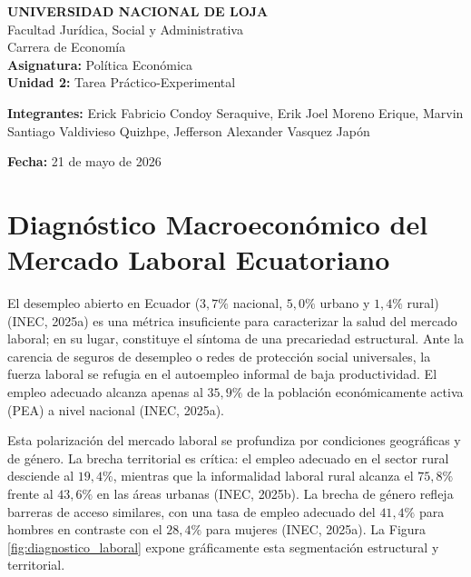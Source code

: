 \documentclass[10pt,]{article}
\renewcommand*\figurename{Figure}
\newcommand\figurename{Figure}
\renewcommand*\tablename{Table}
\newcommand\tablename{Table}
\begin{document}
\renewcommand{\figurename}{Figura}
\renewcommand{\tablename}{Tabla}

\begin{center}
\textbf{UNIVERSIDAD NACIONAL DE LOJA} \\
Facultad Jurídica, Social y Administrativa \\
Carrera de Economía \\
\textbf{Asignatura:} Política Económica \\
\textbf{Unidad 2:} Tarea Práctico-Experimental \\
\vspace{1em}
\end{center}

\noindent \textbf{Integrantes:} Erick Fabricio Condoy Seraquive, Erik
Joel Moreno Erique, Marvin Santiago Valdivieso Quizhpe, Jefferson
Alexander Vasquez Japón

\noindent \textbf{Fecha:} 21 de mayo de 2026 \vspace{1.5em}

\section{Diagnóstico Macroeconómico del Mercado Laboral
Ecuatoriano}\label{diagnuxf3stico-macroeconuxf3mico-del-mercado-laboral-ecuatoriano}

El desempleo abierto en Ecuador (\(3,7\%\) nacional, \(5,0\%\) urbano y
\(1,4\%\) rural) (INEC, 2025a) es una métrica insuficiente para
caracterizar la salud del mercado laboral; en su lugar, constituye el
síntoma de una precariedad estructural. Ante la carencia de seguros de
desempleo o redes de protección social universales, la fuerza laboral se
refugia en el autoempleo informal de baja productividad. El empleo
adecuado alcanza apenas al \(35,9\%\) de la población económicamente
activa (PEA) a nivel nacional (INEC, 2025a).

Esta polarización del mercado laboral se profundiza por condiciones
geográficas y de género. La brecha territorial es crítica: el empleo
adecuado en el sector rural desciende al \(19,4\%\), mientras que la
informalidad laboral rural alcanza el \(75,8\%\) frente al \(43,6\%\) en
las áreas urbanas (INEC, 2025b). La brecha de género refleja barreras de
acceso similares, con una tasa de empleo adecuado del \(41,4\%\) para
hombres en contraste con el \(28,4\%\) para mujeres (INEC, 2025a). La
Figura \ref{fig:diagnostico_laboral} expone gráficamente esta
segmentación estructural y territorial.
\end{document}
